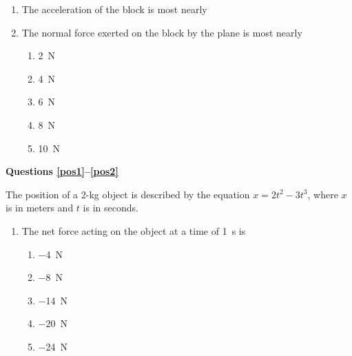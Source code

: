 \documentclass{../../../oss-classkick}
\begin{document}
\begin{multicols*}{2}
  \begin{enumerate}[resume,leftmargin=18pt]
  \item The acceleration of the block is most nearly
    \label{plane1}
    
  \item The normal force exerted on the block by the plane is most nearly
    \begin{enumerate}[nosep,leftmargin=18pt,label=(\Alph*)]
    \item\SI{2}{\newton}
    \item\SI{4}{\newton}
    \item\SI{6}{\newton}
    \item\SI{8}{\newton}
    \item\SI{10}{\newton}
    \end{enumerate}
    \label{plane2}
  \end{enumerate}
  
  \textbf{Questions \ref{pos1}--\ref{pos2}}

  The position of a 2-kg object is described by the equation
  $x=2t^2-3t^3$, where $x$ is in meters and $t$ is in seconds.
  \begin{enumerate}[resume,leftmargin=18pt]
  \item The net force acting on the object at a time of \SI{1}{s} is
    \begin{enumerate}[nosep,leftmargin=18pt,label=(\Alph*)]
    \item\SI{-4}{\newton}
    \item\SI{-8}{\newton}
    \item\SI{-14}{\newton}
    \item\SI{-20}{\newton}
    \item\SI{-24}{\newton}
    \end{enumerate}
    \label{pos1}
    

\end{enumerate}
\end{multicols*}
\end{document}
